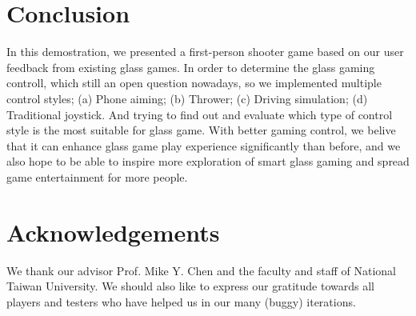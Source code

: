 \documentclass{sigchi}
\begin{document}
\section{Conclusion}
In this demostration, we presented a first-person shooter game based on our user feedback from existing glass games. In order to determine the glass gaming controll, which still an open question nowadays, so we implemented multiple control styles; (a) Phone aiming; (b) Thrower; (c) Driving simulation; (d) Traditional joystick. And trying to find out and evaluate which type of control style is the most suitable for glass game. With better gaming control, we belive that it can enhance glass game play experience significantly than before, and we also hope to be able to inspire more exploration of smart glass gaming and spread game entertainment for more people.


\section{Acknowledgements}
We thank our advisor Prof. Mike Y. Chen and the faculty and staff of National Taiwan University. We should also like to express our gratitude towards all players and testers who have helped us in our many (buggy) iterations.

\balance



\end{document}
